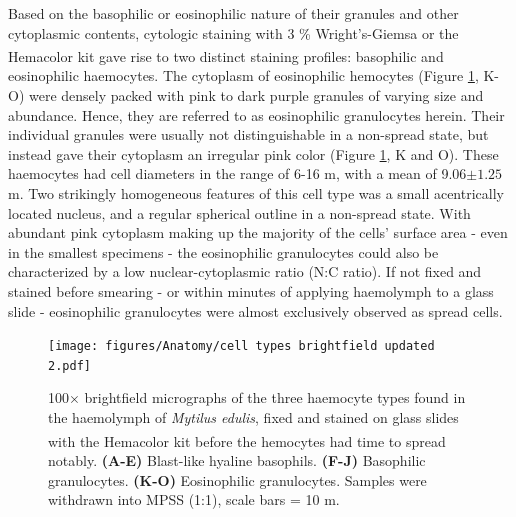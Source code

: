 Based on the basophilic or eosinophilic nature of their granules and other cytoplasmic contents, cytologic staining with 3 \% Wright's-Giemsa or the Hemacolor\textsuperscript{\textregistered} kit gave rise to two distinct staining profiles: basophilic and eosinophilic haemocytes. The cytoplasm of eosinophilic hemocytes (Figure \ref{fig:celltypes}, K-O) were densely packed with pink to dark purple granules of varying size and abundance. Hence, they are referred to as eosinophilic granulocytes herein. Their individual granules were usually not distinguishable in a non-spread state, but instead gave their cytoplasm an irregular pink color (Figure \ref{fig:celltypes}, K and O). These haemocytes had cell diameters in the range of 6-16 \micro m, with a mean of 9.06$\pm1.25$ \micro m. Two strikingly homogeneous features of this cell type was a small acentrically located nucleus, and a regular spherical outline in a non-spread state. With abundant pink cytoplasm making up the majority of the cells' surface area - even in the smallest specimens - the eosinophilic granulocytes could also be characterized by a low nuclear-cytoplasmic ratio (N:C ratio). If not fixed and stained before smearing - or within minutes of applying haemolymph to a glass slide - eosinophilic granulocytes were almost exclusively observed as spread cells. 

\begin{figure}[!ht]
    \centering
    \texttt{[image: figures/Anatomy/cell types brightfield updated 2.pdf]}
    \caption{100$\times$ brightfield micrographs of the three haemocyte types found in the haemolymph of \emph{Mytilus edulis}, fixed and stained on glass slides with the Hemacolor\textsuperscript{\textregistered} kit before the hemocytes had time to spread notably. \textbf{(A-E)} Blast-like hyaline basophils. \textbf{(F-J)} Basophilic granulocytes. \textbf{(K-O)} Eosinophilic granulocytes. Samples were withdrawn into MPSS (1:1), scale bars = 10 \micro m.}
    \label{fig:celltypes}
\end{figure}

